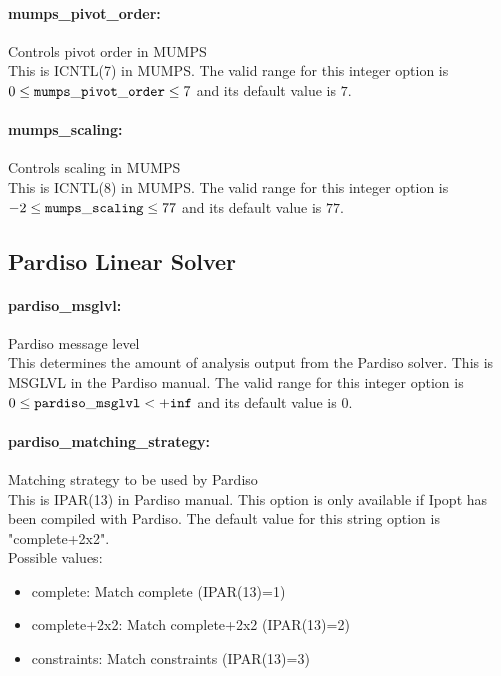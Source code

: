 \paragraph{mumps\_pivot\_order:}\label{opt:mumps_pivot_order} Controls pivot order in MUMPS \\
 This is ICNTL(7) in MUMPS. The valid range for this integer option is
$0 \le {\tt mumps\_pivot\_order } \le 7$
and its default value is $7$.


\paragraph{mumps\_scaling:}\label{opt:mumps_scaling} Controls scaling in MUMPS \\
 This is ICNTL(8) in MUMPS. The valid range for this integer option is
$-2 \le {\tt mumps\_scaling } \le 77$
and its default value is $77$.


\subsection{Pardiso Linear Solver}

\paragraph{pardiso\_msglvl:}\label{opt:pardiso_msglvl} Pardiso message level \\
 This determines the amount of analysis output
from the Pardiso solver. This is MSGLVL in the
Pardiso manual. The valid range for this integer option is
$0 \le {\tt pardiso\_msglvl } <  {\tt +inf}$
and its default value is $0$.


\paragraph{pardiso\_matching\_strategy:}\label{opt:pardiso_matching_strategy} Matching strategy to be used by Pardiso \\
 This is IPAR(13) in Pardiso manual.  This option
is only available if Ipopt has been compiled with
Pardiso. The default value for this string option is "complete+2x2".
\\ 
Possible values:
\begin{itemize}
   \item complete: Match complete (IPAR(13)=1)
   \item complete+2x2: Match complete+2x2 (IPAR(13)=2)
   \item constraints: Match constraints (IPAR(13)=3)
\end{itemize}

